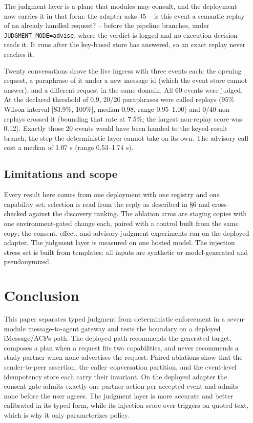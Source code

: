 \documentclass[runningheads,a4paper]{llncs}
\begin{document}
The judgment layer is a plane that modules may consult, and the deployment now carries it in that form: the adapter asks J5 -- is this event a semantic replay of an already handled request? -- before the pipeline branches, under \texttt{JUDGMENT\_\allowbreak{}MODE=advise}, where the verdict is logged and no execution decision reads it. It runs after the key-based store has answered, so an exact replay never reaches it.

Twenty conversations drove the live ingress with three events each: the opening request, a paraphrase of it under a new message id (which the event store cannot answer), and a different request in the same domain. All 60 events were judged. At the declared threshold of 0.9, 20/20 paraphrases were called replays (95\% Wilson interval [83.9\%, 100\%], median 0.98, range 0.95--1.00) and 0/40 non-replays crossed it (bounding that rate at 7.5\%; the largest non-replay score was 0.12). Exactly those 20 events would have been handed to the keyed-result branch, the step the deterministic layer cannot take on its own. The advisory call cost a median of 1.07 s (range 0.53--1.74 s).

\subsection{Limitations and scope}

Every result here comes from one deployment with one registry and one capability set; selection is read from the reply as described in §6 and cross-checked against the discovery ranking. The ablation arms are staging copies with one environment-gated change each, paired with a control built from the same copy; the consent, effect, and advisory-judgment experiments run on the deployed adapter. The judgment layer is measured on one hosted model. The injection stress set is built from templates; all inputs are synthetic or model-generated and pseudonymized.

\section{Conclusion}

This paper separates typed judgment from deterministic enforcement in a seven-module message-to-agent gateway and tests the boundary on a deployed iMessage/ACPs path. The deployed path recommends the generated target, composes a plan when a request fits two capabilities, and never recommends a study partner when none advertises the request. Paired ablations show that the sender-to-peer assertion, the caller--conversation partition, and the event-level idempotency store each carry their invariant. On the deployed adapter the consent gate admits exactly one partner action per accepted event and admits none before the user agrees. The judgment layer is more accurate and better calibrated in its typed form, while its injection score over-triggers on quoted text, which is why it only parameterizes policy.
\end{document}
